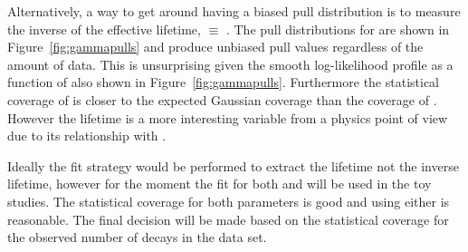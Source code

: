 {Alternatively, a way to get around having a biased pull distribution is to measure the inverse of the effective lifetime, \invtmumu$ \equiv$ \Gmumu. The pull distributions for \Gmumu are shown in Figure~\ref{fig:gammapulls} and produce unbiased pull values regardless of the amount of data. This is unsurprising given the smooth log-likelihood profile as a function of \Gmumu also shown in Figure~\ref{fig:gammapulls}. Furthermore the statistical coverage of \Gmumu is closer to the expected Gaussian coverage than the coverage of \tmumu.  However the lifetime is a more interesting variable from a physics point of view due to its relationship with \ADG. %


Ideally the fit strategy would be performed to extract the lifetime not the inverse lifetime, however for the moment the \ml fit for both \tmumu and \Gmumu will be used in the toy studies. The statistical coverage for both parameters is good and using either is reasonable. The final decision will be made based on the statistical coverage for the observed number of decays in the data set. 



}
